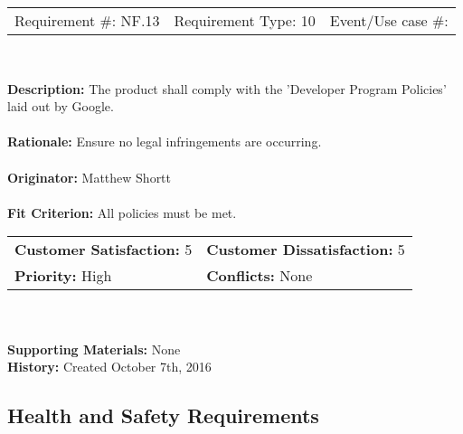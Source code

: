 \documentclass[12pt, titlepage]{article}
\begin{document}
\begin{framed}
	
	\begin{center}
		
		\begin{tabular}{ l c r }
			Requirement \#: NF.13 & Requirement Type: 10 & Event/Use case \#: \\
		\end{tabular} \\
	\end{center}
	\textbf{Description:} The product shall comply with the 'Developer Program Policies' laid 
	out by Google.\\
	\\
	\textbf{Rationale:} Ensure no legal infringements are occurring.  \\
	\\
	\textbf{Originator:} Matthew Shortt \\
	\\
	\textbf{Fit Criterion:} All policies must be met. 
	\\
	
	\begin{tabular}{ll}
		\textbf{Customer Satisfaction:} 5 & \textbf{Customer Dissatisfaction:} 5 \\
		\textbf{Priority:} High & \textbf{Conflicts:} None\\
	\end{tabular} \\
	\\
	\textbf{Supporting Materials:} None \\
	\textbf{History:} Created October 7th, 2016
	
\end{framed}

\subsection{Health and Safety Requirements}
\end{document}
